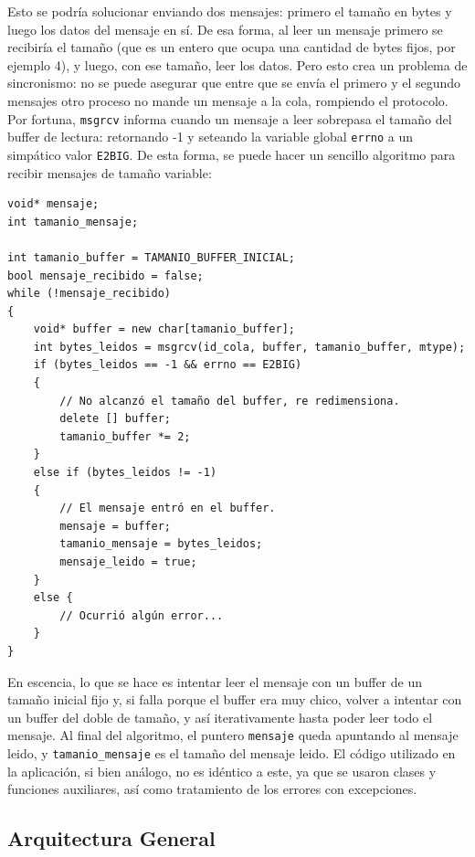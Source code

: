 Esto se podría solucionar enviando dos mensajes: primero el tamaño en bytes y luego los datos del mensaje en sí. De esa forma, al leer un mensaje primero se recibiría el tamaño (que es un entero que ocupa una cantidad de bytes fijos, por ejemplo 4), y luego, con ese tamaño, leer los datos. Pero esto crea un problema de sincronismo: no se puede asegurar que entre que se envía el primero y el segundo mensajes otro proceso no mande un mensaje a la cola, rompiendo el protocolo. \\

Por fortuna, \verb|msgrcv| informa cuando un mensaje a leer sobrepasa el tamaño del buffer de lectura: retornando -1 y seteando la variable global \verb|errno| a un simpático valor \verb|E2BIG|. De esta forma, se puede hacer un sencillo algoritmo para recibir mensajes de tamaño variable:

\begin{small}
\begin{verbatim}
void* mensaje;
int tamanio_mensaje;

int tamanio_buffer = TAMANIO_BUFFER_INICIAL;
bool mensaje_recibido = false;
while (!mensaje_recibido)
{
    void* buffer = new char[tamanio_buffer];
    int bytes_leidos = msgrcv(id_cola, buffer, tamanio_buffer, mtype);
    if (bytes_leidos == -1 && errno == E2BIG)
    {
        // No alcanzó el tamaño del buffer, re redimensiona.
        delete [] buffer;
        tamanio_buffer *= 2;
    }
    else if (bytes_leidos != -1) 
    {
        // El mensaje entró en el buffer.
        mensaje = buffer;
        tamanio_mensaje = bytes_leidos;
        mensaje_leido = true;
    }
    else {
        // Ocurrió algún error...
    }
}
\end{verbatim}
\end{small}

En escencia, lo que se hace es intentar leer el mensaje con un buffer de un tamaño inicial fijo y, si falla porque el buffer era muy chico, volver a intentar con un buffer del doble de tamaño, y así iterativamente hasta poder leer todo el mensaje. Al final del algoritmo, el puntero \verb|mensaje| queda apuntando al mensaje leido, y \verb|tamanio_mensaje| es el tamaño del mensaje leido. El código utilizado en la aplicación, si bien análogo, no es idéntico a este, ya que se usaron clases y funciones auxiliares, así como tratamiento de los errores con excepciones. \\

\subsection{Arquitectura General}

